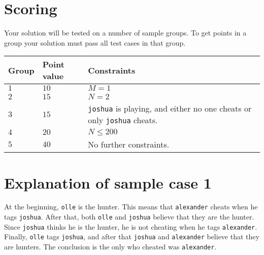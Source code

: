 \section*{Scoring}
Your solution will be tested on a number of sample groups.
To get points in a group your solution must pass all test cases in that group.


\noindent
\begin{tabular}{| l | l | l |}
  \hline
  Group & Point value & Constraints \\ \hline \hline
  $1$    & $10$       & $M = 1$ \\ \hline
  $2$    & $15$       & $N = 2$ \\ \hline
  $3$    & $15$       & \texttt{joshua} is playing, and either no one cheats or only \texttt{joshua} cheats. \\ \hline
  $4$    & $20$       & $N \leq 200$ \\ \hline
  $5$    & $40$       & No further constraints. \\ \hline
\end{tabular}


\section*{Explanation of sample case 1}
At the beginning, \texttt{olle} is the hunter.
This means that \texttt{alexander} cheats when he tags \texttt{joshua}.
After that, both \texttt{olle} and \texttt{joshua} believe that they are the hunter.
Since \texttt{joshua} thinks he is the hunter, he is not cheating when he tags \texttt{alexander}.
Finally, \texttt{olle} tags \texttt{joshua}, and after that \texttt{joshua} and \texttt{alexander} believe that they are hunters.
The conclusion is the only who cheated was \texttt{alexander}.
